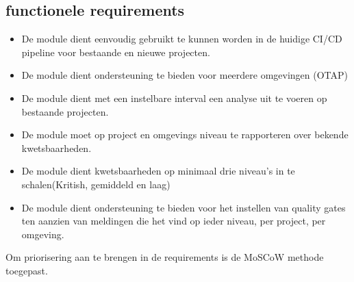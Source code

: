 \subsection{functionele requirements}\label{subsec:functionele-requirements}
\begin{itemize}
    \item De module dient eenvoudig gebruikt te kunnen worden in de huidige CI/CD pipeline voor bestaande en nieuwe projecten.
    \item De module dient ondersteuning te bieden voor meerdere omgevingen (OTAP)
    \item De module dient met een instelbare interval een analyse uit te voeren op bestaande projecten.
    \item De module moet op project en omgevings niveau te rapporteren over bekende kwetsbaarheden.
    \item De module dient kwetsbaarheden op minimaal drie niveau's in te schalen(Kritish, gemiddeld en laag)
    \item De module dient ondersteuning te bieden voor het instellen van quality gates ten aanzien van meldingen die het vind op ieder niveau, per project, per omgeving.
\end{itemize}



Om priorisering aan te brengen in de requirements is de MoSCoW methode toegepast.

